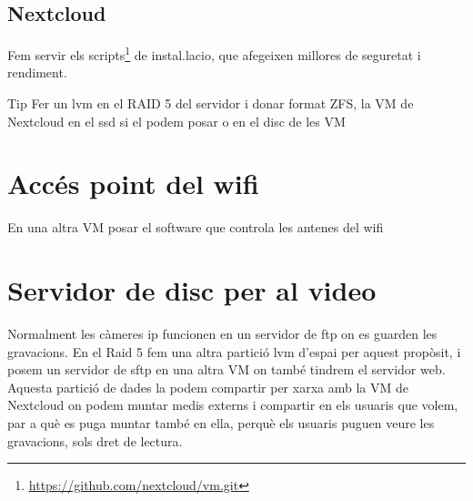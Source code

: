 \documentclass[
  10pt,
]{krantz}
\DeclareRobustCommand{\href}[2]{#2\footnote{\url{#1}}}
\begin{document}
\hypertarget{nextcloud-1}{%
\subsection{Nextcloud}\label{nextcloud-1}}

Fem servir els \href{https://github.com/nextcloud/vm.git}{scripts} de instal.lacio, que afegeixen millores de seguretat i rendiment.

\begin{rmdtip}{Tip}
Fer un lvm en el RAID 5 del servidor i donar format ZFS, la VM de Nextcloud en el ssd si el podem posar o en el disc de les VM

\end{rmdtip}

\hypertarget{accuxe9s-point-del-wifi}{%
\section{Accés point del wifi}\label{accuxe9s-point-del-wifi}}

En una altra VM posar el software que controla les antenes del wifi

\hypertarget{servidor-de-disc-per-al-video}{%
\section{Servidor de disc per al video}\label{servidor-de-disc-per-al-video}}

Normalment les càmeres ip funcionen en un servidor de ftp on es guarden les gravacions. En el Raid 5 fem una altra partició lvm d'espai per aquest propòsit, i posem un servidor de sftp en una altra VM on també tindrem el servidor web. Aquesta partició de dades la podem compartir per xarxa amb la VM de Nextcloud on podem muntar medis externs i compartir en els usuaris que volem, par a què es puga muntar també en ella, perquè els usuaris puguen veure les gravacions, sols dret de lectura.

  
\end{document}
